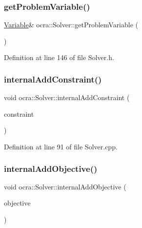 \subsubsection{\texorpdfstring{get\+Problem\+Variable()}{getProblemVariable()}}
{\footnotesize\ttfamily \hyperlink{classocra_1_1Variable}{Variable}\& ocra\+::\+Solver\+::get\+Problem\+Variable (\begin{DoxyParamCaption}{ }\end{DoxyParamCaption})\hspace{0.3cm}{\ttfamily [inline]}}



Definition at line 146 of file Solver.\+h.

\hypertarget{classocra_1_1Solver_a18205ea34fae445bc22444655654552e}{}\label{classocra_1_1Solver_a18205ea34fae445bc22444655654552e} 
\subsubsection{\texorpdfstring{internal\+Add\+Constraint()}{internalAddConstraint()}}
{\footnotesize\ttfamily void ocra\+::\+Solver\+::internal\+Add\+Constraint (\begin{DoxyParamCaption}\item[{const \hyperlink{namespaceocra_af10341108ce661566aad00908668e2b1}{Generic\+Constraint} \&}]{constraint }\end{DoxyParamCaption})\hspace{0.3cm}{\ttfamily [protected]}}



Definition at line 91 of file Solver.\+cpp.

\hypertarget{classocra_1_1Solver_a451bb1506e4bb0423cddee847e4134e9}{}\label{classocra_1_1Solver_a451bb1506e4bb0423cddee847e4134e9} 
\subsubsection{\texorpdfstring{internal\+Add\+Objective()}{internalAddObjective()}}
{\footnotesize\ttfamily void ocra\+::\+Solver\+::internal\+Add\+Objective (\begin{DoxyParamCaption}\item[{const \hyperlink{namespaceocra_a37a91885f4fa5c523d22cb15d5673062}{Generic\+Objective} \&}]{objective }\end{DoxyParamCaption})\hspace{0.3cm}{\ttfamily [protected]}}



